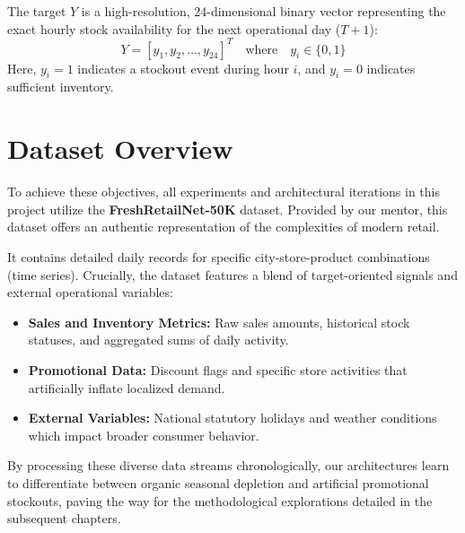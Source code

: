 The target $Y$ is a high-resolution, 24-dimensional binary vector representing the exact hourly stock availability for the next operational day ($T+1$):
\begin{equation}
    Y = [y_1, y_2, \dots, y_{24}]^T \quad \text{where} \quad y_i \in \{0, 1\}
\end{equation}
Here, $y_i = 1$ indicates a stockout event during hour $i$, and $y_i = 0$ indicates sufficient inventory.

\section{Dataset Overview}

To achieve these objectives, all experiments and architectural iterations in this project utilize the \textbf{FreshRetailNet-50K} dataset. Provided by our mentor, this dataset offers an authentic representation of the complexities of modern retail.

It contains detailed daily records for specific city-store-product combinations (time series). Crucially, the dataset features a blend of target-oriented signals and external operational variables:

\begin{itemize}
    \item \textbf{Sales and Inventory Metrics:} Raw sales amounts, historical stock statuses, and aggregated sums of daily activity.
    \item \textbf{Promotional Data:} Discount flags and specific store activities that artificially inflate localized demand.
    \item \textbf{External Variables:} National statutory holidays and weather conditions which impact broader consumer behavior.
\end{itemize}

By processing these diverse data streams chronologically, our architectures learn to differentiate between organic seasonal depletion and artificial promotional stockouts, paving the way for the methodological explorations detailed in the subsequent chapters.
